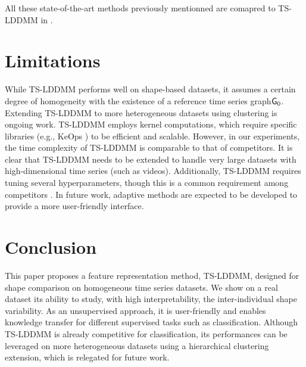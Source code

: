  All these state-of-the-art methods previously mentionned \cite{glaunes2008large,oh2024stable,wu2024shape,heo2024logistic} are comapred to TS-LDDMM in .
  \section{Limitations}
  \label{sec:limitations}
  While TS-LDDMM performs well on shape-based datasets, it assumes a certain degree of homogeneity with the existence of a reference time series graph$\mathsf{G}_0$.
 Extending TS-LDDMM to more heterogeneous datasets using clustering is ongoing work.
 TS-LDDMM employs kernel computations, which require specific libraries (e.g., KeOps \cite{charlier2021kernel}) to be efficient and scalable.
 However, in our experiments, the time complexity of TS-LDDMM is comparable to that of competitors.
 It is clear that TS-LDDMM needs to be extended to handle very large datasets with high-dimensional time series (such as videos).
 Additionally, TS-LDDMM requires tuning several hyperparameters, though this is a common requirement among competitors \cite{glaunes2008large, oh2024stable, wu2024shape, heo2024logistic}.
 In future work, adaptive methods are expected to be developed to provide a more user-friendly interface.
\section{Conclusion}
\vspace{-1ex}
This paper proposes a feature representation method, TS-LDDMM, designed for 
shape comparison on homogeneous time series datasets. We show on a real dataset 
its ability to study, with high interpretability, the inter-individual shape 
variability. As an unsupervised approach, it is user-friendly and enables knowledge 
transfer for different supervised tasks such as classification. Although TS-LDDMM 
is already competitive for classification, its performances can be leveraged on 
more heterogeneous datasets using a hierarchical clustering extension, which is relegated for future work. 




